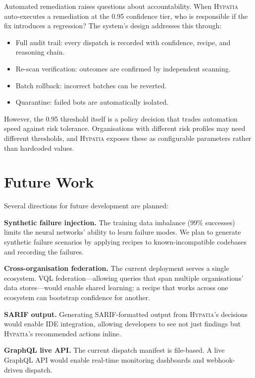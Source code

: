 \documentclass[11pt,a4paper]{article}
\begin{document}
Automated remediation raises questions about accountability. When \textsc{Hypatia} auto-executes a remediation at the 0.95 confidence tier, who is responsible if the fix introduces a regression? The system's design addresses this through:
\begin{itemize}[nosep]
  \item Full audit trail: every dispatch is recorded with confidence, recipe, and reasoning chain.
  \item Re-scan verification: outcomes are confirmed by independent scanning.
  \item Batch rollback: incorrect batches can be reverted.
  \item Quarantine: failed bots are automatically isolated.
\end{itemize}

However, the 0.95 threshold itself is a policy decision that trades automation speed against risk tolerance. Organisations with different risk profiles may need different thresholds, and \textsc{Hypatia} exposes these as configurable parameters rather than hardcoded values.


\section{Future Work}
\label{sec:future}

Several directions for future development are planned:

\textbf{Synthetic failure injection.} The training data imbalance (99\% successes) limits the neural networks' ability to learn failure modes. We plan to generate synthetic failure scenarios by applying recipes to known-incompatible codebases and recording the failures.

\textbf{Cross-organisation federation.} The current deployment serves a single ecosystem. VQL federation---allowing queries that span multiple organisations' data stores---would enable shared learning: a recipe that works across one ecosystem can bootstrap confidence for another.

\textbf{SARIF output.} Generating SARIF-formatted output from \textsc{Hypatia}'s decisions would enable IDE integration, allowing developers to see not just findings but \textsc{Hypatia}'s recommended actions inline.

\textbf{GraphQL live API.} The current dispatch manifest is file-based. A live GraphQL API would enable real-time monitoring dashboards and webhook-driven dispatch.
\end{document}

